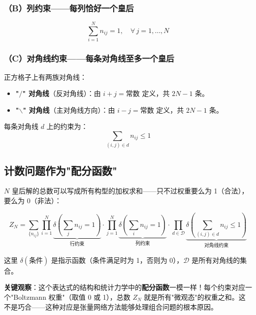 \documentclass[12pt,a4paper]{ctexart}
\begin{document}
\subsubsection*{（B）列约束——每列恰好一个皇后}
\begin{equation}
\sum_{i=1}^{N} n_{ij} = 1, \quad \forall\, j = 1, \ldots, N
\end{equation}

\subsubsection*{（C）对角线约束——每条对角线至多一个皇后}

正方格子上有两族对角线：
\begin{itemize}
    \item \textbf{"$/$" 对角线}（反对角线）：由 $i + j = \text{常数}$ 定义，共 $2N - 1$ 条。
    \item \textbf{"$\backslash$" 对角线}（主对角线方向）：由 $i - j = \text{常数}$ 定义，共 $2N - 1$ 条。
\end{itemize}

每条对角线 $d$ 上的约束为：
\begin{equation}
\sum_{(i,j) \in d} n_{ij} \leq 1
\end{equation}

\subsection{计数问题作为"配分函数"}

$N$ 皇后解的总数可以写成所有构型的加权求和——只不过权重要么为 1（合法），要么为 0（非法）：

\begin{equation}
\boxed{
Z_N = \sum_{\{n_{ij}\}} \prod_{i=1}^{N} \underbrace{\delta\!\left(\sum_j n_{ij} = 1\right)}_{\text{行约束}} \cdot \prod_{j=1}^{N} \underbrace{\delta\!\left(\sum_i n_{ij} = 1\right)}_{\text{列约束}} \cdot \prod_{d \in \mathcal{D}} \underbrace{\delta\!\left(\sum_{(i,j)\in d} n_{ij} \leq 1\right)}_{\text{对角线约束}}
}
\end{equation}

这里 $\delta(\text{条件})$ 是指示函数（条件满足时为 1，否则为 0），$\mathcal{D}$ 是所有对角线的集合。

\textbf{关键观察}：这个表达式的结构和统计力学中的\textbf{配分函数}一模一样！每个约束对应一个"Boltzmann 权重"（取值 0 或 1），总数 $Z_N$ 就是所有"微观态"的权重之和。这不是巧合——这种对应是张量网络方法能够处理组合问题的根本原因。
\end{document}
